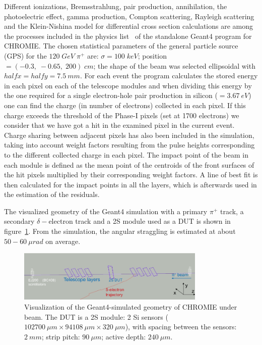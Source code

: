 \documentclass[a4paper,11pt]{article}
\begin{document}
Different ionizations, Bremsstrahlung, pair production, annihilation, the photoelectric effect, gamma production, Compton scattering, Rayleigh scattering and the Klein-Nishina model for differential cross section calculations are among the processes included in the physics list~\cite{j} of the standalone Geant4 program for CHROMIE. The chosen statistical parameters of the general particle source (GPS) for the $120\; GeV\; \pi^{+}$ are: $\sigma = 100\; keV$; position $= (-0.3,\; -0.65,\; 200)\; cm$; the shape of the beam was selected ellipsoidal with $halfx = halfy = 7.5\: mm$. For each event the program calculates the stored energy in each pixel on each of the telescope modules and when dividing this energy by the one required for a single electron-hole pair production in silicon ($= 3.67\: eV$) one can find the charge (in number of electrons) collected in each pixel. If this charge exceeds the threshold of the Phase-I pixels (set at 1700 electrons) we consider that we have got a hit in the examined pixel in the current event. Charge sharing between adjacent pixels has also been included in the simulation, taking into account weight factors resulting from the pulse heights corresponding to the different collected charge in each pixel. The impact point of the beam in each module is defined as the mean point of the centroids of the front surfaces of the hit pixels multiplied by their corresponding weight factors. A line of best fit is then calculated for the impact points in all the layers, which is afterwards used in the estimation of the residuals.

The visualized geometry of the Geant4 simulation with a primary $\pi^{+}$ track, a secondary $\delta -$electron track and a 2S module used as a DUT is shown in figure~\ref{fig:3}. From the simulation, the angular straggling is estimated at about $50-60\: \mu rad$ on average.

\begin{figure}[htbp]
	\centering %
	\includegraphics[width=0.8\textwidth,origin=c,angle=0]{visualization.png}
	\caption{\label{fig:3} Visualization of the Geant4-simulated geometry of CHROMIE under beam. The DUT is a 2S module: 2 Si sensors ($102700\: \mu m \times 94108\: \mu m \times 320\: \mu m$), with spacing between the sensors: $2\: mm$; strip pitch: $90\: \mu m$; active depth:  $240\: \mu m$.}
\end{figure}
\end{document}
